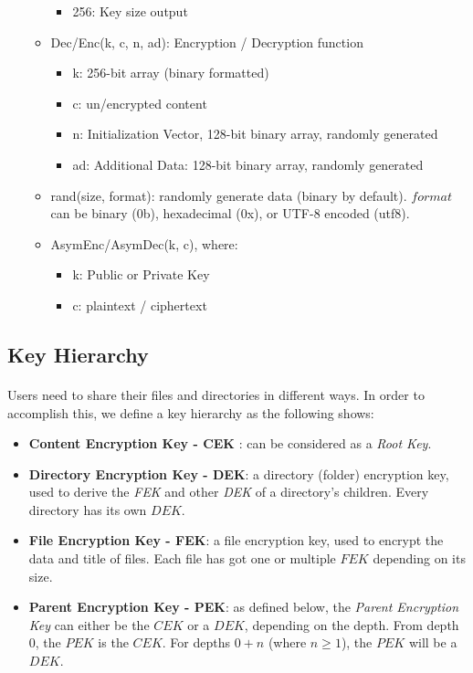 \documentclass[a4paper,9pt,twoside]{article}
\begin{document}
\begin{itemize}
\begin{itemize}
\begin{itemize}
\item 256: Key size output
\end{itemize} %
\item Dec/Enc(k, c, n, ad): Encryption / Decryption function
\begin{itemize} %
\item k: 256-bit array (binary formatted)
\item c: un/encrypted content
\item n: Initialization Vector, 128-bit binary array, randomly generated
\item ad: Additional Data: 128-bit binary array, randomly generated
\end{itemize} %
\item rand(size, format): randomly generate data (binary by default). $format$ can be 
binary (0b), hexadecimal (0x), or UTF-8 encoded (utf8).
\item AsymEnc/AsymDec(k, c), where:
\begin{itemize}
\item k: Public or Private Key
\item c: plaintext / ciphertext
\end{itemize}
\end{itemize}
\end{itemize}

\subsection{Key Hierarchy}

\paragraph{}
Users need to share their files and directories in different ways. In order to accomplish this, 
we define a key hierarchy as the following shows:


\begin{itemize}
\itemsep0em
\item \textbf{Content Encryption Key - CEK }: can be considered as a \emph{Root Key}.
\item \textbf{Directory Encryption Key - DEK}: a directory (folder) encryption key, used to derive the 
\emph{FEK} and other \emph{DEK} of a directory's children. Every directory has its own $DEK$.
\item \textbf{File Encryption Key - FEK}: a file encryption key, used to encrypt the data and title 
of files. Each file has got one or multiple $FEK$ depending on its size.
\item \textbf{Parent Encryption Key - PEK}: as defined below, the \emph{Parent Encryption Key} can 
either be the $CEK$ or a $DEK$, depending on the depth. From depth 0, the $PEK$ is 
the $CEK$. For depths $0+n$ (where $n \ge 1$), the $PEK$ will be a $DEK$.
\end{itemize}
\end{document}
